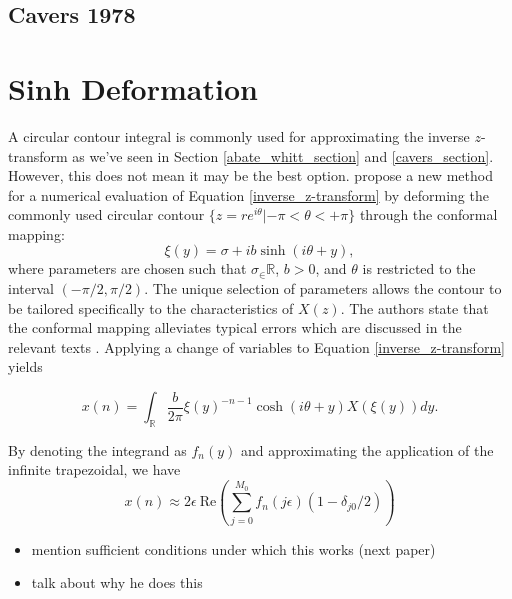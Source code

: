 \documentclass[a4paper]{report}
\begin{document}
\subsection{Cavers 1978}

\section{Sinh Deformation}
A circular contour integral is commonly used for approximating the inverse $z$-transform as we've seen in Section \ref{abate_whitt_section} and \ref{cavers_section}. However, this does not mean it may be the best option. \citet{levendorskii2022sinh} propose a new method for a numerical evaluation of Equation \ref{inverse_z-transform} by deforming the commonly used circular contour $\{z = re^{i\theta} | -\pi < \theta < +\pi\}$ through the conformal mapping:
\begin{equation}\label{equation:conformal_mapping}
    \xi(y) = \sigma + ib\sinh(i\theta + y),
\end{equation}
where parameters are chosen such that $\sigma_\in \mathbb{R}$, $b > 0$, and $\theta$ is restricted to the interval $(-\pi/2, \pi / 2)$. The unique selection of parameters allows the contour to be tailored specifically to the characteristics of $X(z)$. The authors state that the conformal mapping alleviates typical errors which are discussed in the relevant texts \citep{boyarchenko2014efficient, boyarchenko2019sinh, schmelzer2007computing}.  Applying a change of variables to Equation \ref{inverse_z-transform} yields

\begin{equation}
    x(n) = \int_\mathbb{R} \frac{b}{2\pi} \xi(y)^{-n-1} \cosh(i\theta + y) X(\xi(y)) dy.
\end{equation}

By denoting the integrand as $f_n(y)$ and approximating the application of the infinite trapezoidal, we have 
\begin{equation}
    x(n) \approx 2 \epsilon\ \text{Re}\left( \sum_{j = 0}^{M_0} f_n(j \epsilon)(1 - \delta_{j0}/2) \right)
\end{equation}


\begin{itemize}
    \item mention sufficient conditions under which this works (next paper)
    \item talk about why he does this
\end{itemize}
\end{document}

